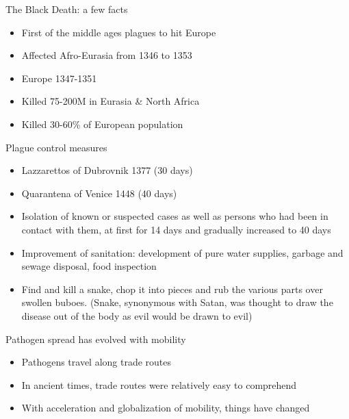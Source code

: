\documentclass[aspectratio=43]{beamer}
\begin{document}

{
\begin{frame}{The Black Death: a few facts}
	\begin{itemize}
		\item First of the middle ages plagues to hit Europe
		\vfill
		\item Affected Afro-Eurasia from 1346 to 1353
		\vfill
		\item Europe 1347-1351
		\vfill
		\item Killed 75-200M in Eurasia \& North Africa
		\vfill
		\item Killed 30-60\% of European population
	\end{itemize}
\end{frame}
}

{
\begin{frame}{Plague control measures}
	\begin{itemize}
		\item Lazzarettos of Dubrovnik 1377 (30 days)
		\vfill
		\item Quarantena of Venice 1448 (40 days)
		\vfill
		\item Isolation of known or suspected cases as well as persons who had been in contact with them, at first for 14 days and gradually increased to 40 days
		\vfill
		\item Improvement of sanitation: development of pure water supplies, garbage and sewage disposal, food inspection
		\vfill
		\item Find and kill a snake, chop it into pieces and rub the various parts over swollen buboes. (Snake, synonymous with Satan, was thought to draw the disease out of the body as evil would be drawn to evil)
	\end{itemize}
\end{frame}
}


\begin{frame}{Pathogen spread has evolved with mobility}
	\begin{itemize}
		\item Pathogens travel along trade routes
		\vfill
		\item In ancient times, trade routes were relatively easy to comprehend
		\vfill
		\item With acceleration and globalization of mobility, things have changed
	\end{itemize}
\end{frame}
\end{document}
